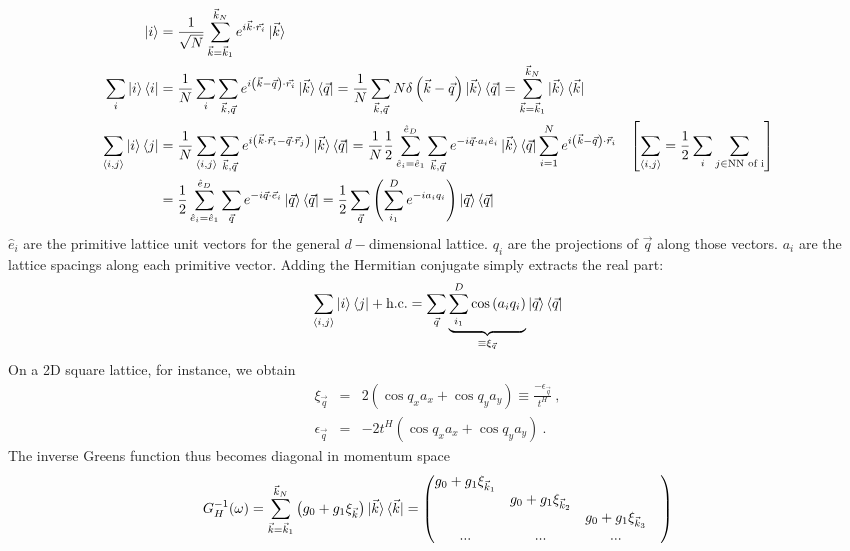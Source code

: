 \documentclass[12pt]{article}
\numberwithin{equation}{section}
\begin{document}
\begin{equation}\begin{aligned}
	\ket{i} &= \frac{1}{\sqrt N}\sum_{\vec k=\vec k_1}^{\vec k_N} e^{i \vec{k}\cdot\vec{r_i}}\ket{\vec k}\\
	\sum_i \ket{i}\bra{i} &= \frac{1}{N}\sum_i \sum_{\vec k, \vec q} e^{i \left(\vec{k} - \vec q\right)\cdot\vec{r_i}}\ket{\vec k}\bra{\vec q} = \frac{1}{N}\sum_{\vec k, \vec q} N \delta\left(\vec{k} - \vec q\right)\ket{\vec k}\bra{\vec q} = \sum_{\vec k=\vec k_1}^{\vec k_N} \ket{\vec k}\bra{\vec k}\\
	\sum_{\left<i,j \right>} \ket{i}\bra{j} &= \frac{1}{N}\sum_{\left<i,j \right>} \sum_{\vec k, \vec q} e^{i \left(\vec{k}\cdot \vec r_i - \vec q\cdot \vec r_j\right)}\ket{\vec k}\bra{\vec q} = \frac{1}{N}\frac{1}{2}\sum_{\hat e_i = \hat e_1}^{\hat e_D}\sum_{\vec k, \vec q} e^{-i\vec q\cdot a_i\hat e_i}\ket{\vec k}\bra{\vec q}\sum_{i=1}^N e^{i \left(\vec{k} - \vec q\right)\cdot \vec r_i} & \left[\sum_{\left<i,j \right>} = \frac{1}{2}\sum_i \sum_{j \in \text{NN of i}}\right] \\
					&=\frac{1}{2}\sum_{\hat e_i = \hat e_1}^{\hat e_D}\sum_{\vec q} e^{-i\vec q\cdot \vec e_i}\ket{\vec q}\bra{\vec q} = \frac{1}{2}\sum_{\vec q} \left(\sum_{i_1}^{D}e^{-ia_iq_i}\right)\ket{\vec q}\bra{\vec q}
\end{aligned}\end{equation}
$\hat e_i$ are the primitive lattice unit vectors for the general $d-$dimensional lattice. $q_i$ are the projections of $\vec q$ along those vectors. $a_i$ are the lattice spacings along each primitive vector. Adding the Hermitian conjugate simply extracts the real part:
\begin{equation}\begin{aligned}
	\sum_{\left<i,j \right>} \ket{i}\bra{j} + \text{h.c.} =\sum_{\vec q} \underbrace{\sum_{i_1}^{D}\cos\left(a_iq_i\right)}_{\equiv \xi_{\vec q}}\ket{\vec q}\bra{\vec q}
\end{aligned}\end{equation}
On a 2D square lattice, for instance, we obtain
\begin{eqnarray}
\xi_{\vec{q}} &=& 2(\cos q_{x}a_{x} + \cos q_{y}a_{y})\equiv \frac{-\epsilon_{\vec{q}}}{t^{H}}~,\nonumber\\
\epsilon_{\vec{q}} &=& -2t^{H}(\cos q_{x}a_{x} + \cos q_{y}a_{y})~.\label{2dsquaretb}
\end{eqnarray}
The inverse Greens function thus becomes diagonal in momentum space
\begin{equation}\begin{aligned}
G_H^{-1}(\omega) = \sum_{\vec k=\vec k_1}^{\vec k_N}\left(g_0 + g_1 \xi_{\vec k}\right)\ket{\vec k}\bra{\vec k} = \begin{pmatrix} g_0 + g_1\xi_{\vec k_1} &&& \\
	& g_0 + g_1\xi_{\vec k_2} && \\
	&& g_0 + g_1\xi_{\vec k_3} & \\
	...&...&...&\\
	\end{pmatrix} 
\end{aligned}\end{equation}
\end{document}
